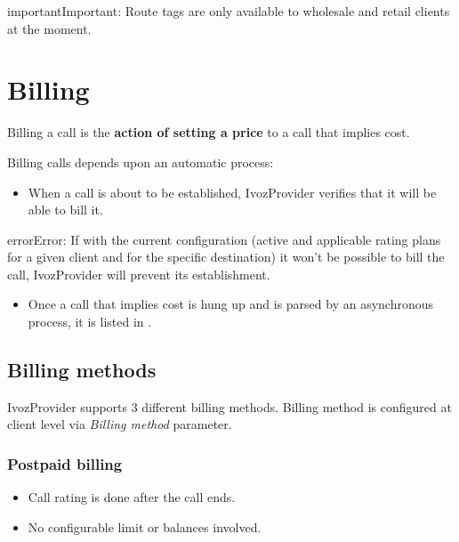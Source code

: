 \documentclass[letterpaper,10pt,english]{sphinxmanual}
\begin{document}
\begin{notice}{important}{Important:}
Route tags are only available to wholesale and retail clients at the moment.
\end{notice}


\section{Billing}
\label{administration_portal/brand/billing/index::doc}\label{administration_portal/brand/billing/index:billing}
Billing a call is the \textbf{action of setting a price} to a call that implies cost.

Billing calls depends upon an automatic process:
\begin{itemize}
\item {} 
When a call is about to be established, IvozProvider verifies that it will be able to bill it.

\end{itemize}

\begin{notice}{error}{Error:}
If with the current configuration (active and applicable rating plans for
a given client and for the specific destination) it won't be possible to
bill the call, IvozProvider will prevent its establishment.
\end{notice}
\begin{itemize}
\item {} 
Once a call that implies cost is hung up and is parsed by an asynchronous process, it is listed in {\hyperref[administration_portal/platform/external_calls:external\string-calls]{}}.

\end{itemize}


\subsection{Billing methods}
\label{administration_portal/brand/billing/index:billing-methods}
IvozProvider supports 3 different billing methods. Billing method is configured at client level via \emph{Billing method} parameter.


\subsubsection{Postpaid billing}
\label{administration_portal/brand/billing/index:postpaid-billing}\begin{itemize}
\item {} 
Call rating is done after the call ends.

\item {} 
No configurable limit or balances involved.

\end{itemize}
\end{document}
